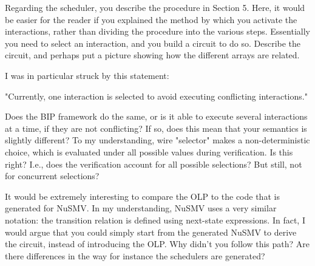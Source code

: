 \done
{}


Regarding the scheduler, you describe the procedure in Section 5. Here, it
would be easier for the reader if you explained the method by which you
activate the interactions, rather than dividing the procedure into the various
steps. Essentially you need to select an interaction, and you build a circuit
to do so. Describe the circuit, and perhaps put a picture showing how the
different arrays are related.



I was in particular struck by this statement:

"Currently, one interaction is selected to avoid executing conflicting
interactions."

Does the BIP framework do the same, or is it able to execute several
interactions at a time, if they are not conflicting? If so, does this mean
that your semantics is slightly different? To my understanding, wire
"selector" makes a non-deterministic choice, which is evaluated under all
possible values during verification. Is this right? I.e., does the
verification account for all possible selections? But still, not for
concurrent selections?

\done
{}


It would be extremely interesting to compare the OLP to the code that is
generated for NuSMV. In my understanding, NuSMV uses a very similar notation:
the transition relation is defined using next-state expressions. In fact, I
would argue that you could simply start from the generated NuSMV to derive the
circuit, instead of introducing the OLP. Why didn't you follow this path? Are
there differences in the way for instance the schedulers are generated?


